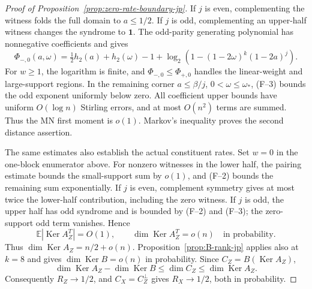 \documentclass[11pt]{article}
\theoremstyle{definition}
\newcommand{\EE}{\mathbb E}
\newcommand{\Ker}{\operatorname{Ker}}
\newcommand{\ones}{\mathbf 1}
\newcommand{\h}{h_2}
\newcommand{\CZ}{C_Z}
\newcommand{\CX}{C_X}
\begin{document}
\begin{proof}[Proof of Proposition~\ref{prop:zero-rate-boundary-jp}]
If \(j\) is even, complementing the witness folds the full domain to
\(a\le1/2\). If \(j\) is odd, complementing an upper-half witness
changes the syndrome to \(\ones\). The odd-parity generating polynomial
has nonnegative coefficients and gives
\[
\Phi_{-,0}(a,\omega)=\tfrac12\h(a)+\h(\omega)-1+
\log_2(1-(1-2\omega)^k(1-2a)^j).
\]
For \(w\ge1\), the logarithm is finite, and \(\Phi_{-,0}\le\Phi_{+,0}\)
handles the linear-weight and large-support regions. In the remaining
corner \(a\le\beta/j\), \(0<\omega\le\omega_*\), (F--3) bounds the
odd exponent uniformly below zero. All coefficient upper bounds have
uniform \(O(\log n)\) Stirling errors, and at most \(O(n^2)\) terms
are summed. Thus the MN first moment is \(o(1)\). Markov's inequality
proves the second distance assertion.

The same estimates also establish the actual constituent rates. Set
\(w=0\) in the one-block enumerator above. For nonzero witnesses in the
lower half, the pairing estimate bounds the small-support sum by \(o(1)\),
and (F--2) bounds the remaining sum exponentially. If \(j\) is even,
complement symmetry gives at most twice the lower-half contribution,
including the zero witness. If \(j\) is odd, the upper half has odd
syndrome and is bounded by (F--2) and (F--3); the zero-support odd term
vanishes. Hence
\[
\EE|\Ker A_Z^T|=O(1),\qquad
\dim\Ker A_Z^T=o(n)\quad\text{in probability}.
\]
Thus \(\dim\Ker A_Z=n/2+o(n)\). Proposition~\ref{prop:B-rank-jp}
applies also at \(k=8\) and gives \(\dim\Ker B=o(n)\) in probability.
Since \(\CZ=B(\Ker A_Z)\),
\[
\dim\Ker A_Z-\dim\Ker B\le\dim\CZ\le\dim\Ker A_Z.
\]
Consequently \(R_Z\to1/2\), and \(\CX=\CZ^\perp\) gives
\(R_X\to1/2\), both in probability.
\end{proof}




\end{document}
